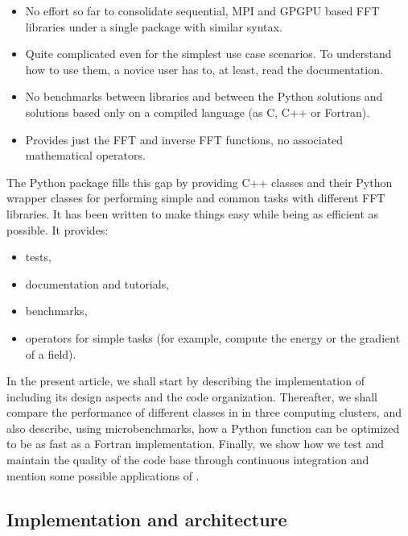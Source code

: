 \begin{itemize}
  \item No effort so far to consolidate sequential, MPI and GPGPU based FFT
  libraries under a single package with similar syntax.

  \item Quite complicated even for the simplest use case scenarios. To
  understand how to use them, a novice user has to, at least, read the
   documentation.

  \item No benchmarks between libraries and between the Python
  solutions and solutions based only on a compiled language (as C, C++ or
  Fortran).

  \item Provides just the FFT and inverse FFT functions, no associated
  mathematical operators.

\end{itemize}

The Python package  fills this gap by providing C++ classes and
their Python wrapper classes for performing simple and common tasks with different
FFT libraries. It has been written to make things easy while being as efficient as
possible. It provides:

\begin{itemize}
\item tests,

\item documentation and tutorials,

\item benchmarks,

\item operators for simple tasks (for example, compute the energy or the
gradient of a field).

\end{itemize}

In the present article, we shall start by describing the implementation of
 including its design aspects and the code organization. Thereafter,
we shall compare the performance of different classes in  in
three computing clusters, and also describe, using microbenchmarks, how a Python
function can be optimized to be as fast as a Fortran implementation. Finally,
we show how we test and maintain the quality of the code base through
continuous integration and mention some possible applications of
.

\subsection{Implementation and architecture}

